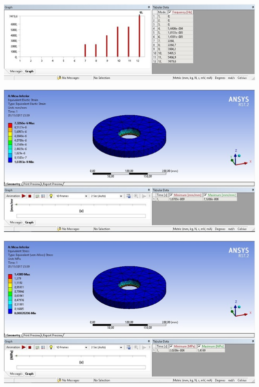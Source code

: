     \begin{center}
    	\includegraphics[scale=0.7]{figuras/ressonancia_1}
        \label{ressonancia_1}
    \end{center}
    
    \begin{center}
    	\includegraphics[scale=0.7]{figuras/sim_estatica_2}
        \label{sim_estatica_2}
    \end{center}
    
    \begin{center}
    	\includegraphics[scale=0.7]{figuras/stress_2}
        \label{stress_2}
    \end{center}
    
